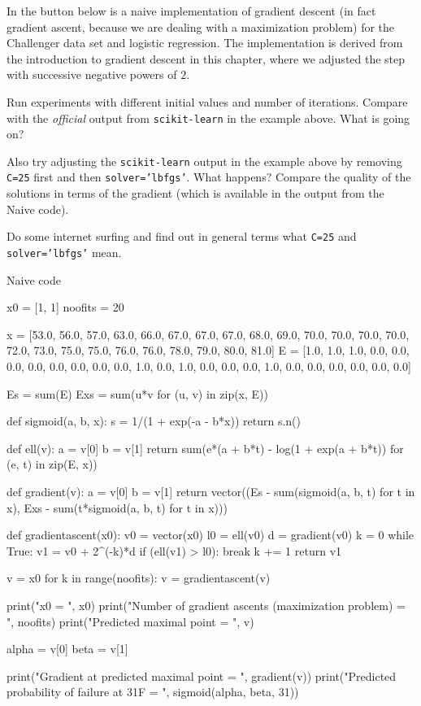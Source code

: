 \documentclass{article}
\begin{document}
\beginshex

In the button below is a naive implementation of gradient descent (in fact gradient ascent, because we are dealing
with a maximization problem) for the Challenger data set and logistic regression. The implementation
is derived from the introduction to gradient descent in this chapter, where we adjusted the step
with successive negative powers of $2$.

Run experiments with different initial values and number of iterations. Compare with the \emph{official}
output from \texttt{scikit-learn} in the example above. What is going on?

Also try adjusting the \texttt{scikit-learn} output in the example
above by removing \texttt{C=25} first and then \texttt{solver='lbfgs'}. What happens? Compare the quality of the
solutions in terms of the gradient (which is available in the output from the Naive code).

Do some internet surfing and find out in general terms what \texttt{C=25} and \texttt{solver='lbfgs'} mean.

\begin{hideinbutton}{Naive code}
\begin{sage}
x0 = [1, 1]    
noofits = 20
  

x = [53.0, 56.0, 57.0, 63.0, 66.0, 67.0, 67.0, 67.0, 68.0, 69.0, 70.0, 70.0, 70.0, 70.0, 72.0, 73.0, 75.0, 75.0, 76.0, 76.0, 78.0, 79.0, 80.0, 81.0]
E = [1.0, 1.0, 1.0, 0.0, 0.0, 0.0, 0.0, 0.0, 0.0, 0.0, 0.0, 1.0, 0.0, 1.0, 0.0, 0.0, 0.0, 1.0, 0.0, 0.0, 0.0, 0.0, 0.0, 0.0]

Es = sum(E)
Exs = sum(u*v for (u, v) in zip(x, E))
    
def sigmoid(a, b, x):
  s = 1/(1 + exp(-a - b*x))
  return s.n()

def ell(v):
  a = v[0]
  b = v[1]
  return sum(e*(a + b*t) - log(1 + exp(a + b*t)) for (e, t) in zip(E, x))
      
def gradient(v):
  a = v[0]
  b = v[1]
  return vector((Es - sum(sigmoid(a, b, t) for t in x), Exs - sum(t*sigmoid(a, b, t) for t in x)))
    
def gradientascent(x0):
  v0 = vector(x0)
  l0 = ell(v0)
  d = gradient(v0)
  k = 0
  while True:
    v1 = v0 + 2^(-k)*d
    if (ell(v1) > l0):
      break
    k += 1
  return v1

v = x0  
for k in range(noofits):
  v = gradientascent(v)

print("x0 = ", x0)
print("Number of gradient ascents (maximization problem) =  ", noofits)
print("Predicted maximal point =  ", v)

alpha = v[0]
beta = v[1]

print("Gradient at predicted maximal point = ", gradient(v))
print("Predicted probability of failure at 31F = ", sigmoid(alpha, beta, 31))
\end{sage} 
\end{hideinbutton}
\end{document}
